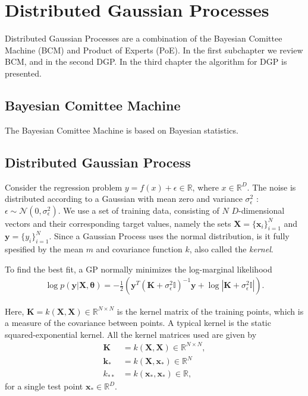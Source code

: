 \documentclass[twoside,english]{uiofysmaster}
\begin{document}


\chapter{Distributed Gaussian Processes}

Distributed Gaussian Processes \cite{deisenroth2015distributed} are a combination of the Bayesian Comittee Machine (BCM) and Product of Experts (PoE). In the first subchapter we review BCM, and in the second DGP. In the third chapter the algorithm for DGP is presented.

\section{Bayesian Comittee Machine}

The Bayesian Comittee Machine \cite{tresp2000bayesian} is based on Bayesian statistics.

\section{Distributed Gaussian Process}

Consider the regression problem $y = f(x) + \epsilon \in \mathbb{R}$, where $x \in \mathbb{R}^D$. The noise is distributed according to a Gaussian with mean zero and variance $\sigma_{\epsilon}^2$ : $\epsilon \sim \mathcal{N}(0, \sigma_{\epsilon}^2)$. We use a set of training data, consisting of $N$ $D$-dimensional vectors and their corresponding target values, namely the sets $\textbf{X} = \{\textbf{x}_i\}_{i=1}^N$ and $\textbf{y} = \{y_i\}_{i=1}^N$. Since a Gaussian Process uses the normal distribution, is it fully spesified by the mean $m$ and covariance function $k$, also called the \textit{kernel}.

To find the best fit, a GP normally minimizes the log-marginal likelihood
\begin{align}
\log p (\textbf{y}|\textbf{X}, \boldsymbol{\theta}) = - \frac{1}{2} (\textbf{y}^T (\textbf{K} + \sigma_{\epsilon}^2 \mathbb{I})^{-1} \textbf{y} + \log |\textbf{K} + \sigma_{\epsilon}^2 \mathbb{I}|).
\end{align}

Here, $\textbf{K} = k(\textbf{X}, \textbf{X}) \in \mathbb{R}^{N \times N}$ is the kernel matrix of the training points, which is a measure of the covariance between points. A typical kernel is the static squared-exponential kernel. All the kernel matrices used are given by
\begin{align}
\textbf{K} &= k(\textbf{X}, \textbf{X}) \in \mathbb{R}^{N \times N},\\
\textbf{k}_* &= k(\textbf{X}, \textbf{x}_*) \in \mathbb{R}^{N}\\
k_{**} &= k(\textbf{x}_*, \textbf{x}_*) \in \mathbb{R},
\end{align}
for a single test point $\textbf{x}_* \in \mathbb{R}^D$.
\end{document}
